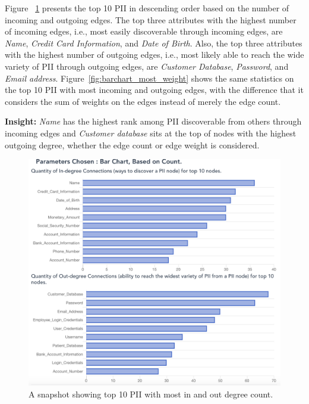\documentclass[conference]{IEEEtran}
\begin{document}
Figure ~\ref{fig:barchart_most_count} presents the top 10 PII in descending order based on the number of incoming and outgoing edges. The top three attributes with the highest number of incoming edges, i.e., most easily discoverable through incoming edges, are \textit{Name}, \textit{Credit Card Information}, and \textit{Date of Birth}. Also, the top three attributes with the highest number of outgoing edges, i.e., most likely able to reach the wide variety of PII through outgoing edges, are \textit{Customer Database}, \textit{Password}, and \textit{Email address}. Figure~\ref{fig:barchart_most_weight} shows the same statistics on the top 10 PII with most incoming and outgoing edges, with the difference that it considers the sum of weights on the edges instead of merely the edge count.

{\bf Insight:} \textit{Name} has the highest rank among PII discoverable from others through incoming edges and \textit{Customer database} sits at the top of nodes with the highest outgoing degree, whether the edge count or edge weight is considered.

\begin{figure}[ht!]
  \includegraphics[width=\linewidth]{barchart_most_count.png}
  \caption{A snapshot showing top 10 PII with most in and out degree count.}
  \label{fig:barchart_most_count}
\end{figure}
\end{document}
